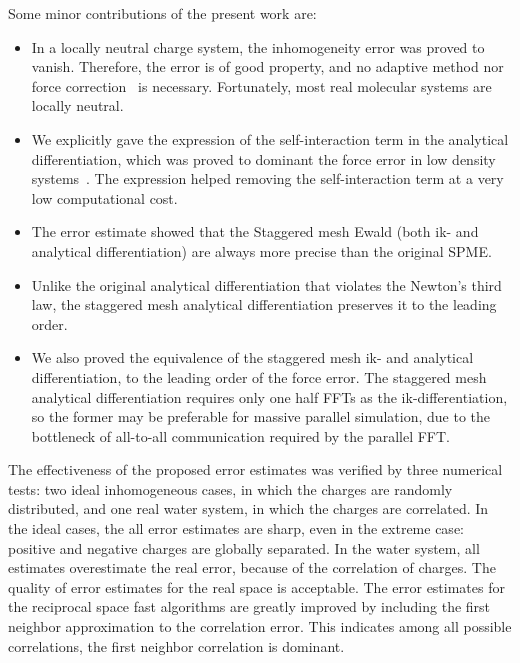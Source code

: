 \documentclass[aps,pre,preprint,unsortedaddress]{revtex4}
\begin{document}

Some minor contributions of the present work are:
\begin{itemize}
\item In a locally neutral charge system, the inhomogeneity
  error was proved to vanish. Therefore, the error
  is of good property, and no adaptive method nor
  force correction~\cite{wang2012} is necessary. Fortunately, most
  real molecular systems are locally neutral.
\item We explicitly gave the expression of the self-interaction term
  in the analytical differentiation, which was proved to dominant the
  force error in low density systems~\cite{cerutti2009staggered}.  The
  expression helped removing the self-interaction term at a very low
  computational cost.
\item The error estimate showed that the Staggered mesh Ewald
  (both ik- and analytical differentiation) are always more precise than
  the original SPME.
\item Unlike the original analytical differentiation
  that violates the Newton's third law, the staggered mesh analytical
  differentiation preserves it to the leading order.
\item We also proved the equivalence of the staggered mesh ik- and analytical
  differentiation, to the leading order of the force error.
  The staggered mesh analytical differentiation requires only one half
  FFTs as the ik-differentiation, so the former may be preferable
  for massive parallel simulation, due to the bottleneck of all-to-all
  communication required by the parallel FFT.
\end{itemize}

The effectiveness of the proposed error estimates was verified by
three numerical tests: two ideal inhomogeneous cases, in which the charges
are randomly distributed,
and one real water system, in which the charges are correlated.
In the ideal cases, the all error estimates are sharp, even in the extreme
case: positive and negative charges are globally separated. 
In the water system,  all estimates overestimate the real error,
because of the correlation of charges.
The quality of  error estimates for the
real space  is acceptable.
The error estimates for the reciprocal space fast algorithms
are greatly improved by including the first neighbor approximation
to the correlation error.
This indicates among all possible correlations, the first
neighbor correlation is dominant.
\end{document}
